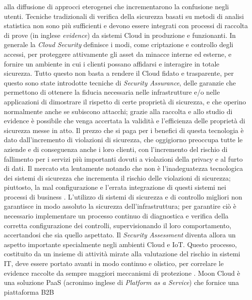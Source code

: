 alla diffusione di approcci eterogenei che incrementarono la confusione negli utenti. 
Tecniche tradizionali di verifica della sicurezza basati su metodi di analisi statistica non sono più sufficienti e devono essere integrati 
con processi di raccolta di prove (in inglese \textit{evidence}) da sistemi Cloud in produzione e funzionanti. 
In generale la \textit{Cloud Security} definisce i modi, come criptazione e controllo degli accessi, per proteggere attivamente gli asset 
da minacce interne ed esterne, e fornire un ambiente in cui i clienti possano affidarsi e interagire in totale sicurezza.\hfill\break
Tutto questo non basta a rendere il Cloud fidato e trasparente, per questo sono state introdotte tecniche di
\textit{Security Assurance}, delle garanzie che permettono di ottenere la fiducia necessaria nelle infrastrutture e/o nelle 
applicazioni di dimostrare il rispetto di certe proprietà di sicurezza, e che operino normalmente anche se subiscono attacchi; grazie 
alla raccolta e allo studio di evidence è possibile che venga accertata la validità e l'efficienza delle proprietà di sicurezza messe in 
atto. \hfill\break
Il prezzo che si paga per i benefici di questa tecnologia è dato dall'incremento di violazioni di sicurezza, che oggigiorno 
preoccupa tutte le aziende e di conseguenza anche i loro clienti, con l'incremento del rischio di fallimento per i servizi più importanti 
dovuti a violazioni della privacy e al furto di dati.
Il mercato sta lentamente notando che non è l'inadeguatezza tecnologica dei sistemi di sicurezza che incrementa il rischio delle 
violazioni di sicurezza; piuttosto, la mal configurazione e l'errata integrazione di questi sistemi nei processi di business 
\cite{cloud-Platform-for-ICT-Security-Governance}.\hfill\break
L'utilizzo di sistemi di sicurezza e di controllo migliori non garantisce in modo assoluto la sicurezza dell'infrastruttura; 
per garantire ciò è necessario implementare un processo continuo di diagnostica e verifica della corretta configurazione dei controlli, 
supervisionando il loro comportamento, accertandosi che sia quello aspettato. \vspace{0.5cm}\hfill\break
Il \textit{Security Assessment} diventa allora un aspetto importante specialmente negli ambienti Cloud e IoT. Questo processo, costituito
da un insieme di attività mirate alla valutazione del rischio in sistemi IT, deve essere portato avanti in modo continuo e olistico, per 
correlare le evidence raccolte da sempre maggiori meccanismi di protezione \cite{mooncloud-semi-automatic-and-trustworthy}.\hfill\break
Moon Cloud è una soluzione PaaS (acronimo inglese di \textit{Platform as a Service}) che fornice una piattaforma B2B 
